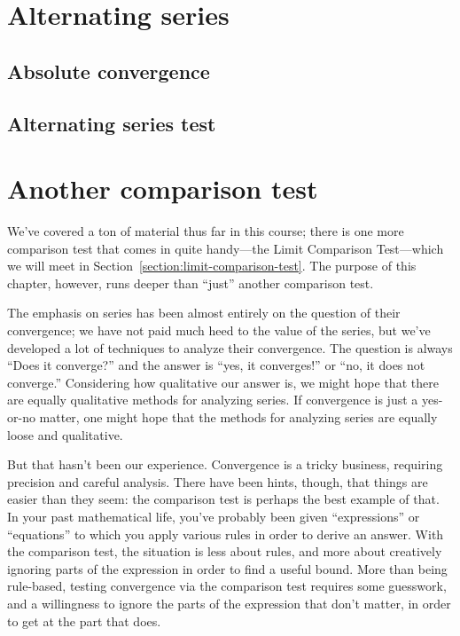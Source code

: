 \documentclass[justified]{tufte-book}
\newcommand{\xrefn}[1]{\ref{#1}}
\begin{document}
\chapter{Alternating series}
\label{chapter:alternating-series}


\section{Absolute convergence}
\label{section:absolute-convergence}


\section{Alternating series test}
\label{section:alternating-series-test}


\chapter{Another comparison test}

We've covered a ton of material thus far in this course; there is one
more comparison test that comes in quite handy---the Limit Comparison
Test---which we will meet in Section~\xrefn{section:limit-comparison-test}.
The purpose of this chapter, however, runs deeper than ``just''
another comparison test.  

The emphasis on series has been almost entirely on the question of
their convergence; we have not paid much heed to the value of the
series, but we've developed a lot of techniques to analyze their
convergence.  The question is always ``Does it converge?'' and the
answer is ``yes, it converges!'' or ``no, it does not converge.''
Considering how qualitative our answer is, we might hope that there
are equally qualitative methods for analyzing series.  If convergence
is just a yes-or-no matter, one might hope that the methods for
analyzing series are equally loose and qualitative.

But that hasn't been our experience.  Convergence is a tricky
business, requiring precision and careful analysis.  There have been
hints, though, that things are easier than they seem: the comparison
test is perhaps the best example of that.  In your past mathematical
life, you've probably been given ``expressions'' or ``equations'' to
which you apply various rules in order to derive an answer.  With the
comparison test, the situation is less about rules, and more about
creatively ignoring parts of the expression in order to find a useful
bound.  More than being rule-based, testing convergence via the
comparison test requires some guesswork, and a willingness to ignore
the parts of the expression that don't matter, in order to get at the
part that does.
\end{document}
